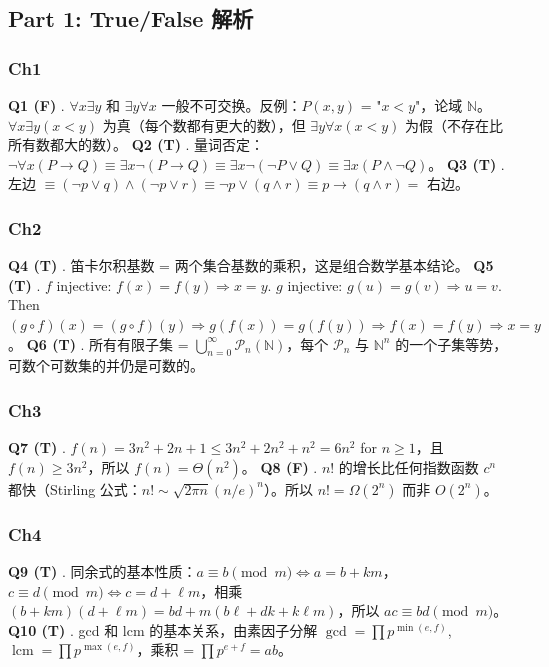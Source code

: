 \documentclass[10pt,a4paper,openany]{ctexbook}
\theoremstyle{definition}
\theoremstyle{remark}
\begin{document}
\subsection{Part 1: True/False 解析}

\subsubsection{Ch1}

\textbf{Q1 (F)} . $\forall x \exists y$ 和 $\exists y \forall x$ 一般不可交换。反例：$P(x,y)$ = "$x < y$"，论域 $\mathbb{N}$。$\forall x \exists y (x < y)$ 为真（每个数都有更大的数），但 $\exists y \forall x (x < y)$ 为假（不存在比所有数都大的数）。
\textbf{Q2 (T)} . 量词否定：$\neg \forall x (P \to Q) \equiv \exists x \neg (P \to Q) \equiv \exists x \neg (\neg P \lor Q) \equiv \exists x (P \land \neg Q)$。
\textbf{Q3 (T)} . 左边 $\equiv (\neg p \lor q) \land (\neg p \lor r) \equiv \neg p \lor (q \land r) \equiv p \to (q \land r) =$ 右边。
\subsubsection{Ch2}

\textbf{Q4 (T)} . 笛卡尔积基数 = 两个集合基数的乘积，这是组合数学基本结论。
\textbf{Q5 (T)} . $f$ injective: $f(x)=f(y) \Rightarrow x=y$. $g$ injective: $g(u)=g(v) \Rightarrow u=v$. Then $(g \circ f)(x) = (g \circ f)(y) \Rightarrow g(f(x)) = g(f(y)) \Rightarrow f(x) = f(y) \Rightarrow x = y$。
\textbf{Q6 (T)} . 所有有限子集 = $\bigcup_{n=0}^{\infty} \mathcal{P}_n(\mathbb{N})$，每个 $\mathcal{P}_n$ 与 $\mathbb{N}^n$ 的一个子集等势，可数个可数集的并仍是可数的。
\subsubsection{Ch3}

\textbf{Q7 (T)} . $f(n) = 3n^2 + 2n + 1 \le 3n^2 + 2n^2 + n^2 = 6n^2$ for $n \ge 1$，且 $f(n) \ge 3n^2$，所以 $f(n) = \Theta(n^2)$。
\textbf{Q8 (F)} . $n!$ 的增长比任何指数函数 $c^n$ 都快（Stirling 公式：$n! \sim \sqrt{2\pi n}(n/e)^n$）。所以 $n! = \Omega(2^n)$ 而非 $O(2^n)$。
\subsubsection{Ch4}

\textbf{Q9 (T)} . 同余式的基本性质：$a \equiv b \pmod{m} \iff a = b + km$，$c \equiv d \pmod{m} \iff c = d + \ell m$，相乘 $(b+km)(d+\ell m) = bd + m(b\ell + dk + k\ell m)$，所以 $ac \equiv bd \pmod{m}$。
\textbf{Q10 (T)} . gcd 和 lcm 的基本关系，由素因子分解 $\gcd = \prod p^{\min(e,f)}$, $\operatorname{lcm} = \prod p^{\max(e,f)}$，乘积 = $\prod p^{e+f} = ab$。
\end{document}
